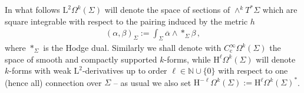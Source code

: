In what follows $\mathrm{L}^2\Omega^k(\Sigma)$ will denote the space of sections of $\wedge^kT^*\Sigma$ which are square integrable with respect to the pairing induced by the metric $h$
\begin{align}\label{Eqn: L2-scalar product}
	(\alpha,\beta)_\Sigma:=\int_\Sigma\overline{\alpha}\wedge\ast_\Sigma\beta\,,
\end{align}
where $\ast_\Sigma$ is the Hodge dual.
Similarly we shall denote with $C^\infty_{\mathrm{c}}\Omega^k(\Sigma)$ the space of smooth and compactly supported $k$-forms, while $\mathrm{H}^\ell\Omega^k(\Sigma)$ will denote $k$-forms with weak $\mathrm{L}^2$-derivatives up to order $\ell\in\mathbb{N}\cup\{0\}$ with respect to one (hence all) connection over $\Sigma$ -- as usual we also set $\mathrm{H}^{-\ell}\Omega^k(\Sigma):=\mathrm{H}^\ell\Omega^k(\Sigma)^*$.
\\\\

